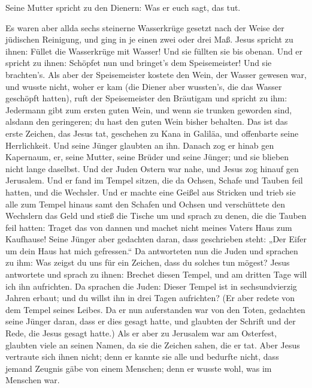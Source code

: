  Seine Mutter spricht zu den Dienern: Was er euch sagt,
das tut.

 Es waren aber allda sechs steinerne Wasserkrüge gesetzt
nach der Weise der jüdischen Reinigung, und ging in je einen zwei oder
drei Maß.  Jesus spricht zu ihnen: Füllet die Wasserkrüge
mit Wasser! Und sie füllten sie bis obenan.  Und er
spricht zu ihnen: Schöpfet nun und bringet's dem Speisemeister! Und sie
brachten's.  Als aber der Speisemeister kostete den Wein,
der Wasser gewesen war, und wusste nicht, woher er kam (die Diener aber
wussten's, die das Wasser geschöpft hatten), ruft der Speisemeister den
Bräutigam  und spricht zu ihm: Jedermann gibt zum ersten
guten Wein, und wenn sie trunken geworden sind, alsdann den geringeren;
du hast den guten Wein bisher behalten.  Das ist das
erste Zeichen, das Jesus tat, geschehen zu Kana in Galiläa, und
offenbarte seine Herrlichkeit. Und seine Jünger glaubten an ihn.
 Danach zog er hinab gen Kapernaum, er, seine Mutter,
seine Brüder und seine Jünger; und sie blieben nicht lange daselbst.
 Und der Juden Ostern war nahe, und Jesus zog hinauf gen
Jerusalem.  Und er fand im Tempel sitzen, die da Ochsen,
Schafe und Tauben feil hatten, und die Wechsler.  Und er
machte eine Geißel aus Stricken und trieb sie alle zum Tempel hinaus
samt den Schafen und Ochsen und verschüttete den Wechslern das Geld und
stieß die Tische um  und sprach zu denen, die die Tauben
feil hatten: Traget das von dannen und machet nicht meines Vaters Haus
zum Kaufhause!  Seine Jünger aber gedachten daran, dass
geschrieben steht: „Der Eifer um dein Haus hat mich gefressen.``
 Da antworteten nun die Juden und sprachen zu ihm: Was
zeigst du uns für ein Zeichen, dass du solches tun mögest?
 Jesus antwortete und sprach zu ihnen: Brechet diesen
Tempel, und am dritten Tage will ich ihn aufrichten.  Da
sprachen die Juden: Dieser Tempel ist in sechsundvierzig Jahren erbaut;
und du willst ihn in drei Tagen aufrichten?  (Er aber
redete von dem Tempel seines Leibes.  Da er nun
auferstanden war von den Toten, gedachten seine Jünger daran, dass er
dies gesagt hatte, und glaubten der Schrift und der Rede, die Jesus
gesagt hatte.)  Als er aber zu Jerusalem war am
Osterfest, glaubten viele an seinen Namen, da sie die Zeichen sahen, die
er tat.  Aber Jesus vertraute sich ihnen nicht; denn er
kannte sie alle  und bedurfte nicht, dass jemand Zeugnis
gäbe von einem Menschen; denn er wusste wohl, was im Menschen war.

